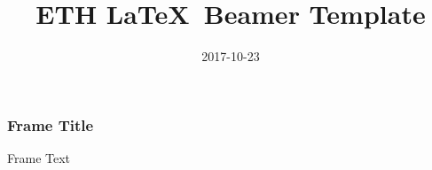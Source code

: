 \documentclass[aspectratio=43]{beamer}
\title{ETH \LaTeX\ Beamer Template}
\date{2017-10-23}
\begin{document}
\begin{frame}
\frametitle{Frame Title}

Frame Text

\end{frame}
\end{document}
